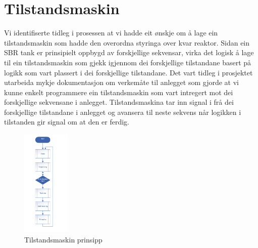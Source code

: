 \section{Tilstandsmaskin}
\thispagestyle{fancy}



Vi identifiserte tidleg i prosessen at vi hadde eit ønskje om å lage ein tilstandsmaskin som hadde den overordna styringa over kvar reaktor. 
Sidan ein SBR tank er prinsipielt oppbygd av forskjellige sekvensar, virka det logisk å lage til ein tilstandsmaskin som gjekk igjennom dei forskjellige tilstandane basert på logikk som vart plassert i dei forskjellige tilstandane. 
Det vart tidleg i prosjektet utarbeida mykje dokumentasjon om verkemåte til anlegget som gjorde at vi kunne enkelt programmere ein tilstandsmaskin som vart intregert mot dei forskjellige sekvensane i anlegget. 
Tilstandsmaskina tar inn signal i frå dei forskjellige tilstandane i anlegget og avansera til neste sekvens når logikken i tilstanden gir signal om at den er ferdig. 

\begin{figure}[htbp]
    \centering
    \includegraphics[width=0.2\textwidth]{Bilder/Tilstandsmaskin_prinsipp.png}
    \caption{Tilstandsmaskin prinsipp}\label{fig:Tilstandsmaskin prinsipp}    
\end{figure}

\newpage

